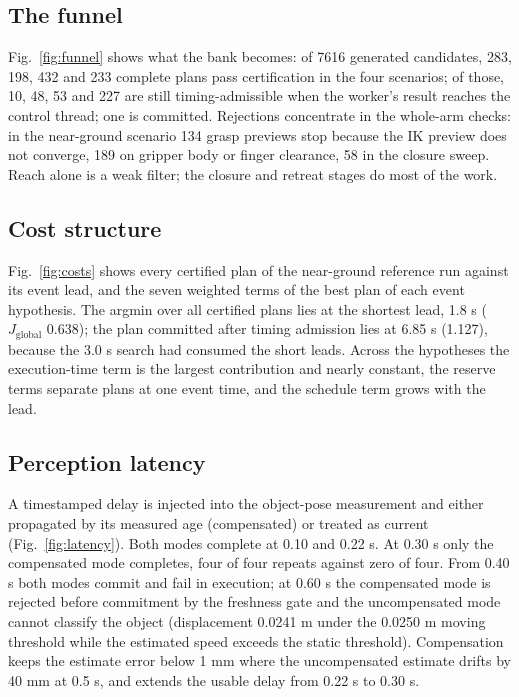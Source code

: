 \documentclass[conference]{IEEEtran}
\begin{document}
\subsection{The funnel}
Fig.~\ref{fig:funnel} shows what the bank becomes: of 7616 generated candidates, 283, 198, 432 and 233 complete plans pass certification in the four scenarios; of those, 10, 48, 53 and 227 are still timing-admissible when the worker's result reaches the control thread; one is committed. Rejections concentrate in the whole-arm checks: in the near-ground scenario 134 grasp previews stop because the IK preview does not converge, 189 on gripper body or finger clearance, 58 in the closure sweep. Reach alone is a weak filter; the closure and retreat stages do most of the work.

\subsection{Cost structure}
Fig.~\ref{fig:costs} shows every certified plan of the near-ground reference run against its event lead, and the seven weighted terms of the best plan of each event hypothesis. The argmin over all certified plans lies at the shortest lead, 1.8 s ($J_{\mathrm{global}}$ 0.638); the plan committed after timing admission lies at 6.85 s (1.127), because the 3.0 s search had consumed the short leads. Across the hypotheses the execution-time term is the largest contribution and nearly constant, the reserve terms separate plans at one event time, and the schedule term grows with the lead.

\subsection{Perception latency}
A timestamped delay is injected into the object-pose measurement and either propagated by its measured age (compensated) or treated as current (Fig.~\ref{fig:latency}). Both modes complete at 0.10 and 0.22 s. At 0.30 s only the compensated mode completes, four of four repeats against zero of four. From 0.40 s both modes commit and fail in execution; at 0.60 s the compensated mode is rejected before commitment by the freshness gate and the uncompensated mode cannot classify the object (displacement 0.0241 m under the 0.0250 m moving threshold while the estimated speed exceeds the static threshold). Compensation keeps the estimate error below 1 mm where the uncompensated estimate drifts by 40 mm at 0.5 s, and extends the usable delay from 0.22 s to 0.30 s.
\end{document}
